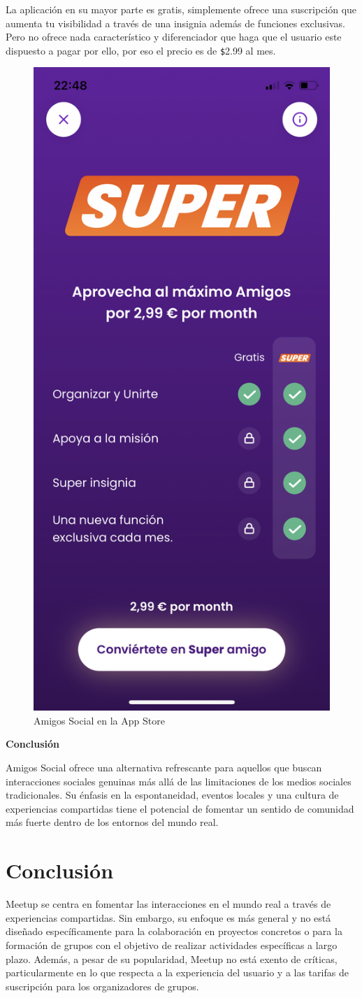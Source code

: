 La aplicación en su mayor parte es gratis, simplemente ofrece una suscripción que aumenta tu visibilidad a través de una insignia además de funciones exclusivas.
Pero no ofrece nada característico y diferenciador que haga que el usuario este dispuesto a pagar por ello, por eso el precio es de \verb|$|2.99 al mes.

\begin{figure}[H]
  \centering
  \includegraphics[cframe=black 2pt,width=0.3\linewidth]{images/estadodelarte/amigossocialsuper.jpeg}
  \caption{Amigos Social en la App Store}
  \label{fig:amigosocial_appstore}
\end{figure}

\textbf{Conclusión}

Amigos Social ofrece una alternativa refrescante para aquellos que buscan interacciones sociales genuinas más allá de las limitaciones de los medios sociales tradicionales. Su énfasis en la espontaneidad, eventos locales y una cultura de experiencias compartidas tiene el potencial de fomentar un sentido de comunidad más fuerte dentro de los entornos del mundo real.


\section{Conclusión}

Meetup se centra en fomentar las interacciones en el mundo real a 
través de experiencias compartidas. Sin embargo, su enfoque es más 
general y no está diseñado específicamente para la colaboración en 
proyectos concretos o para la formación de grupos con el objetivo de 
realizar actividades específicas a largo plazo. Además, a pesar de su 
popularidad, Meetup no está exento de críticas, particularmente en lo 
que respecta a la experiencia del usuario y a las tarifas de suscripción 
para los organizadores de grupos.

